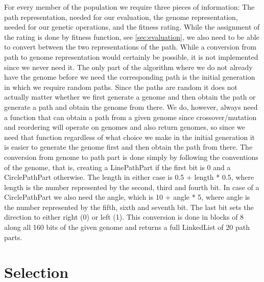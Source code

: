 For every member of the population we require three pieces of information: The path representation, needed for our evaluation, the genome representation, needed for our genetic operations, and the fitness rating. While the assignment of the rating is done by fitness function, see \ref{sec:evaluation}, we also need to be able to convert between the two representations of the path. While a conversion from path to genome representation would certainly be possible, it is not implemented since we never need it. The only part of the algorithm where we do not already have the genome before we need the corresponding path is the initial generation in which we require random paths. Since the paths are random it does not actually matter whether we first generate a genome and then obtain the path or generate a path and obtain the genome from there. We do, however, always need a function that can obtain a path from a given genome since crossover/mutation and reordering will operate on genomes and also return genomes, so since we need that function regardless of what choice we make in the initial generation it is easier to generate the genome first and then obtain the path from there.
The conversion from genome to path part is done simply by following the conventions of the genome, that is, creating a LinePathPart if the first bit is 0 and a CirclePathPart otherwise. The length in either case is 0.5 + length * 0.5, where length is the number represented by the second, third and fourth bit.
In case of a CirclePathPart we also need the angle, which is 10 + angle * 5, where angle is the number represented by the fifth, sixth and seventh bit. The last bit sets the direction to either right (0) or left (1).
This conversion is done in blocks of 8 along all 160 bits of the given genome and returns a full LinkedList of 20 path parts.

\section{Selection} %
\label{sec:imp_selection}

